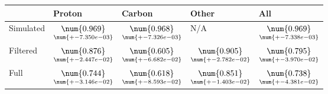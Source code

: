 \begin{tabular}{lllll}
\toprule
{} &                                              Proton &                                              Carbon &                                               Other &                                                 All \\
\midrule
Simulated &  $\underset{\num{+- 7.350e-03 }  }{\num{ 0.969 } }$ &  $\underset{\num{+- 7.326e-03 }  }{\num{ 0.968 } }$ &  N/A &  $\underset{\num{+- 7.338e-03 }  }{\num{ 0.969 } }$ \\
Filtered  &  $\underset{\num{+- 2.447e-02 }  }{\num{ 0.876 } }$ &  $\underset{\num{+- 6.682e-02 }  }{\num{ 0.605 } }$ &  $\underset{\num{+- 2.782e-02 }  }{\num{ 0.905 } }$ &  $\underset{\num{+- 3.970e-02 }  }{\num{ 0.795 } }$ \\
Full      &  $\underset{\num{+- 3.146e-02 }  }{\num{ 0.744 } }$ &  $\underset{\num{+- 8.593e-02 }  }{\num{ 0.618 } }$ &  $\underset{\num{+- 1.403e-02 }  }{\num{ 0.851 } }$ &  $\underset{\num{+- 4.381e-02 }  }{\num{ 0.738 } }$ \\
\bottomrule
\end{tabular}
